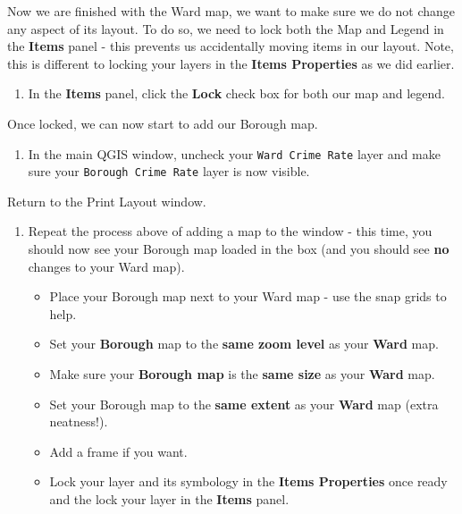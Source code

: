 \documentclass[
]{book}
\providecommand{\tightlist}{%
  \setlength{\itemsep}{0pt}\setlength{\parskip}{0pt}}
\begin{document}
Now we are finished with the Ward map, we want to make sure we do not change any aspect of its layout. To do so, we need to lock both the Map and Legend in the \textbf{Items} panel - this prevents us accidentally moving items in our layout. Note, this is different to locking your layers in the \textbf{Items Properties} as we did earlier.

\begin{enumerate}
\def\labelenumi{\arabic{enumi}.}
\setcounter{enumi}{3}
\tightlist
\item
  In the \textbf{Items} panel, click the \textbf{Lock} check box for both our map and legend.
\end{enumerate}

Once locked, we can now start to add our Borough map.

\begin{enumerate}
\def\labelenumi{\arabic{enumi}.}
\setcounter{enumi}{4}
\tightlist
\item
  In the main QGIS window, uncheck your \texttt{Ward\ Crime\ Rate} layer and make sure your \texttt{Borough\ Crime\ Rate} layer is now visible.
\end{enumerate}

Return to the Print Layout window.

\begin{enumerate}
\def\labelenumi{\arabic{enumi}.}
\setcounter{enumi}{5}
\tightlist
\item
  Repeat the process above of adding a map to the window - this time, you should now see your Borough map loaded in the box (and you should see \textbf{no} changes to your Ward map).

  \begin{itemize}
  \tightlist
  \item
    Place your Borough map next to your Ward map - use the snap grids to help.
  \item
    Set your \textbf{Borough} map to the \textbf{same zoom level} as your \textbf{Ward} map.
  \item
    Make sure your \textbf{Borough map} is the \textbf{same size} as your \textbf{Ward} map.
  \item
    Set your Borough map to the \textbf{same extent} as your \textbf{Ward} map (extra neatness!).
  \item
    Add a frame if you want.
  \item
    Lock your layer and its symbology in the \textbf{Items Properties} once ready and the lock your layer in the \textbf{Items} panel.
  \end{itemize}
\end{enumerate}
\end{document}
